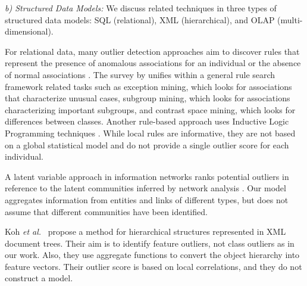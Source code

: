 \documentclass[conference]{IEEEtran}
\begin{document}
\textit{b) Structured Data Models:} We discuss related techniques in three types of structured data models: SQL (relational), XML (hierarchical), and OLAP (multi-dimensional). 

For relational data, many outlier detection approaches aim to discover rules that represent the presence of anomalous associations for an individual or the absence of normal associations \cite{Maervoet2012,Gao2010}. The survey by \cite{Novak2009} unifies within a general rule search framework related tasks such as exception mining, which looks for associations that characterize unusual cases, subgroup mining, which looks for associations  characterizing important subgroups, and contrast space mining, which looks for differences between classes. Another rule-based approach uses Inductive Logic Programming techniques \cite{Angiulli2007}.
While local rules are informative, they are not based on a global statistical model and do not provide a single outlier score for each individual. 

A latent variable approach in information networks ranks potential outliers in reference to the latent communities inferred by network analysis \cite{Gao2010}. Our model aggregates information from entities and links of different types, but does not assume that different communities have been identified. 


Koh {\em et al.}~\cite{Koh2008} propose a method for hierarchical structures represented in XML document trees. Their aim is to identify feature outliers, not class outliers as in our work. Also, they use aggregate functions to convert the object hierarchy into feature vectors. Their outlier score is based on local correlations, and they do not construct a model.
\end{document}
